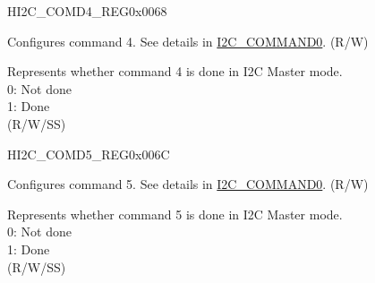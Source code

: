     \begin{register}{H}{I2C\_COMD4\_REG}{0x0068}\label{regdesc:I2CCOMD4REG}
    \regnewline%
    \begin{regdesc}\begin{reglist}
    \label{fielddesc:I2CCOMMAND4}\item [I2C\_COMMAND4] Configures command 4. See details in  \hyperref[fielddesc:I2CCOMMAND0]{I2C\_COMMAND0}. (R/W)
    \label{fielddesc:I2CCOMMAND4DONE}\item [I2C\_COMMAND4\_DONE] Represents whether command 4 is done in I2C Master mode.\\
    0: Not done \\
    1: Done \\ (R/W/SS)
    \end{reglist}\end{regdesc}
    \end{register}


    \begin{register}{H}{I2C\_COMD5\_REG}{0x006C}\label{regdesc:I2CCOMD5REG}
    \regnewline%
    \begin{regdesc}\begin{reglist}
    \label{fielddesc:I2CCOMMAND5}\item [I2C\_COMMAND5] Configures command 5. See details in \hyperref[fielddesc:I2CCOMMAND0]{I2C\_COMMAND0}. (R/W)
    \label{fielddesc:I2CCOMMAND5DONE}\item [I2C\_COMMAND5\_DONE] Represents whether command 5 is done in I2C Master mode.\\
    0: Not done \\
    1: Done \\ (R/W/SS)
    \end{reglist}\end{regdesc}
    \end{register}


